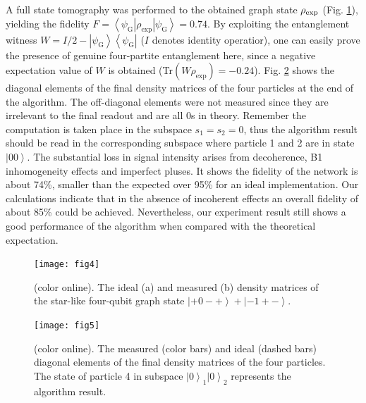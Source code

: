 \documentclass[showpacs,superscriptaddress,twocolumn,prl]{revtex4}
\begin{document}
A full state tomography was performed to the obtained graph state $\rho _{%
\text{exp}}$ (Fig. \ref{exgraphstate}), yielding the fidelity $%
F=\left\langle \psi _{\text{G}}\right\vert \rho _{\text{exp}}\left\vert \psi
_{\text{G}}\right\rangle =0.74$. By exploiting the entanglement witness \cite%
{witness} $W=I/2-\left\vert \psi _{\text{G}}\right\rangle \left\langle \psi
_{\text{G}}\right\vert $ ($I$ denotes identity operatior), one can easily
prove the presence of genuine four-partite entanglement here, since a
negative expectation value of $W$ is obtained (Tr$(W\rho _{\text{exp}})=-0.24
$). Fig. \ref{finalresult} shows the diagonal elements of the final density
matrices of the four particles at the end of the algorithm. The off-diagonal
elements were not measured since they are irrelevant to the final readout
and are all $0$s in theory. Remember the computation is taken place in the
subspace $s_{1}=s_{2}=0$, thus the algorithm result should be read in the
corresponding subspace where particle 1 and 2 are in state $\left\vert
00\right\rangle $. The substantial loss in signal intensity arises from
decoherence, B1 inhomogeneity effects and imperfect pluses. It shows the
fidelity of the network is about 74\%, smaller than the expected over 95\%
for an ideal implementation. Our calculations indicate that in the absence
of incoherent effects an overall fidelity of about 85\% could be achieved.
Nevertheless, our experiment result still shows a good performance of the
algorithm when compared with the theoretical expectation.

\begin{figure}[tbp]
\begin{center}
\texttt{[image: fig4]}
\end{center}
\caption{(color online). The ideal (a) and measured (b) density matrices of
the star-like four-qubit graph state $\left\vert +0-+ \right\rangle +
\left\vert -1+- \right\rangle $.}
\label{exgraphstate}
\end{figure}

\begin{figure}[tbp]
\begin{center}
\texttt{[image: fig5]}
\end{center}
\caption{(color online). The measured (color bars) and ideal (dashed bars)
diagonal elements of the final density matrices of the four particles. The
state of particle 4 in subspace $\left\vert 0\right\rangle _1 \left\vert
0\right\rangle _2$ represents the algorithm result.}
\label{finalresult}
\end{figure}
\end{document}
